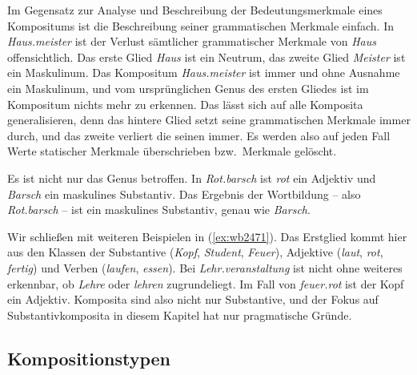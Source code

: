 Im Gegensatz zur Analyse und Beschreibung der Bedeutungsmerkmale eines Kompositums ist die Beschreibung seiner grammatischen Merkmale einfach.
In \textit{Haus.meister} ist \zB der Verlust sämtlicher grammatischer Merkmale von \textit{Haus} offensichtlich.
Das erste Glied \textit{Haus} ist \zB ein Neutrum, das zweite Glied \textit{Meister} ist ein Maskulinum.
Das Kompositum \textit{Haus.meister} ist immer und ohne Ausnahme ein Maskulinum, und vom ursprünglichen Genus des ersten Gliedes ist im Kompositum nichts mehr zu erkennen.
Das lässt sich auf alle Komposita generalisieren, denn das hintere Glied setzt seine grammatischen Merkmale immer durch, und das zweite verliert die seinen immer.
Es werden also auf jeden Fall Werte statischer Merkmale überschrieben bzw.\ Merkmale gelöscht.


Es ist nicht nur das Genus betroffen.
In \textit{Rot.barsch} ist \textit{rot} ein Adjektiv und \textit{Barsch} ein maskulines Substantiv.
Das Ergebnis der Wortbildung -- also \textit{Rot.barsch} -- ist ein maskulines Substantiv, genau wie \textit{Barsch}.

Wir schließen mit weiteren Beispielen in (\ref{ex:wb2471}).
Das Erstglied kommt hier aus den Klassen der Substantive (\textit{Kopf}, \textit{Student}, \textit{Feuer}), Adjektive (\textit{laut}, \textit{rot}, \textit{fertig}) und Verben (\textit{laufen}, \textit{essen}).
Bei \textit{Lehr.veranstaltung} ist nicht ohne weiteres erkennbar, ob \textit{Lehre} oder \textit{lehren} zugrundeliegt.
Im Fall von \textit{feuer.rot} ist der Kopf ein Adjektiv.
Komposita sind also nicht nur Substantive, und der Fokus auf Substantivkomposita in diesem Kapitel hat nur pragmatische Gründe.

\begin{exe}
  \ex\label{ex:wb2471}
  \begin{xlist}
  \end{xlist}
\end{exe}

\subsection{Kompositionstypen}


